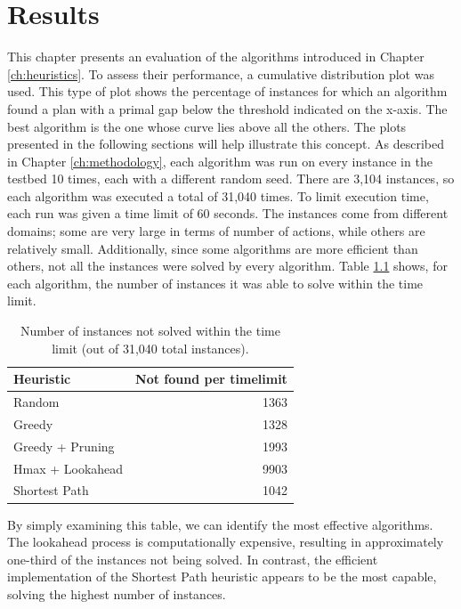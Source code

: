 \chapter{Results}
\label{ch:results}
This chapter presents an evaluation of the algorithms introduced in Chapter \ref{ch:heuristics}.
To assess their performance, a cumulative distribution plot was used.
This type of plot shows the percentage of instances for which an algorithm found a plan with a
primal gap below the threshold indicated on the x-axis.
The best algorithm is the one whose curve lies above all the others.
The plots presented in the following sections will help illustrate this concept.
As described in Chapter \ref{ch:methodology}, each algorithm was run on every instance in the
testbed 10 times, each with a different random seed.
There are 3,104 instances, so each algorithm was executed a total of 31,040 times.
To limit execution time, each run was given a time limit of 60 seconds. The instances
come from different domains; some are very large in terms of number of actions, while others are
relatively small.
Additionally, since some algorithms are more efficient than others, not all the instances
were solved by every algorithm. Table \ref{tab:timelimit} shows, for each algorithm,
the number of instances it was able to solve within the time limit.

\begin{table}[ht]
	\centering
	\begin{tabular}{|l|r|}
		\hline
		\textbf{Heuristic} & \textbf{Not found per timelimit} \\
		\hline
		Random             & 1363                             \\
		Greedy             & 1328                             \\
		Greedy + Pruning   & 1993                             \\
		Hmax + Lookahead   & 9903                             \\
		Shortest Path      & 1042                             \\
		\hline
	\end{tabular}
	\caption{Number of instances not solved within the time limit (out of 31,040 total instances).}
	\label{tab:timelimit}
\end{table}

By simply examining this table, we can identify the most effective algorithms.
The lookahead process is computationally expensive, resulting in approximately one-third of the instances not being solved.
In contrast, the efficient implementation of the Shortest Path heuristic appears to be the most capable,
solving the highest number of instances.


